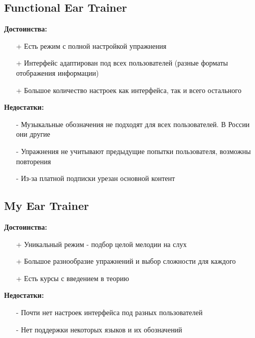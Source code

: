 \subsection*{Functional Ear Trainer\cite{Apps2}}
\begin{minipage}[t]{0.45\textwidth}
\textbf{Достоинства:}
\begin{itemize}
  \item[+] Есть режим с полной настройкой упражнения
  \item[+] Интерфейс адаптирован под всех пользователей (разные форматы отображения информации)
  \item[+] Большое количество настроек как интерфейса, так и всего остального
\end{itemize}
\end{minipage}
\hfill
\begin{minipage}[t]{0.45\textwidth}
\textbf{Недостатки:}
\begin{itemize}
  \item[-] Музыкальные обозначения не подходят для всех пользователей. В России они другие
  \item[-] Упражнения не учитывают предыдущие попытки пользователя, возможны повторения
  \item[-] Из-за платной подписки урезан основной контент
\end{itemize}
\end{minipage}
\subsection*{My Ear Trainer\cite{Apps3}}
\begin{minipage}[t]{0.45\textwidth}
\textbf{Достоинства:}
\begin{itemize}
  \item[+] Уникальный режим - подбор целой мелодии на слух
  \item[+] Большое разнообразие упражнений и выбор сложности для каждого
  \item[+] Есть курсы с введением в теорию	
\end{itemize}
\end{minipage}
\hfill
\begin{minipage}[t]{0.45\textwidth}
\textbf{Недостатки:}
\begin{itemize}
  \item[-] Почти нет настроек интерфейса под разных пользователей
  \item[-] Нет поддержки некоторых языков и их обозначений
\end{itemize}
\end{minipage}

